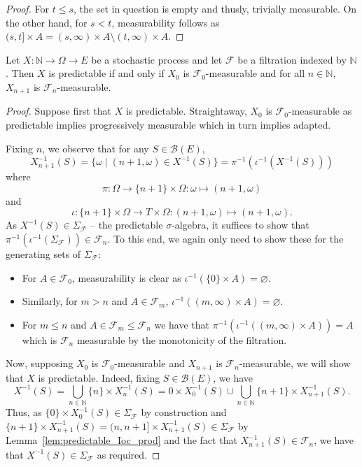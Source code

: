 \begin{proof}\leanok
For $t \le s$, the set in question is empty and thusly, trivially measurable. On the other hand, for $s < t$, measurability follows as
$(s, t] \times A = (s, \infty) \times A \setminus (t, \infty) \times A$.
\end{proof}


\begin{lemma}\label{lem:predictable_nat_iff}
  \mathlibok
Let $X : \mathbb{N} \to \Omega \to E$ be a stochastic process and let $\mathcal{F}$ be a filtration indexed by $\mathbb{N}$.
Then $X$ is predictable if and only if $X_0$ is $\mathcal{F}_0$-measurable and for all $n \in \mathbb{N}$, $X_{n+1}$ is $\mathcal{F}_n$-measurable.
\end{lemma}


\begin{proof}\leanok
Suppose first that $X$ is predictable. Straightaway, $X_0$ is $\mathcal{F}_0$-measurable as predictable implies progressively measurable which in turn implies adapted.

Fixing $n$, we observe that for any $S \in \mathcal{B}(E)$,
$$X_{n + 1}^{-1}(S) = \{\omega \mid (n + 1, \omega) \in X^{-1}(S)\} = \pi^{-1}(\iota^{-1}(X^{-1}(S)))$$
where
$$\pi : \Omega \to \{n + 1\} \times \Omega : \omega \mapsto (n + 1, \omega)$$
and
$$\iota : \{n + 1\} \times \Omega \to T \times \Omega : (n + 1, \omega) \mapsto (n + 1, \omega).$$
As $X^{-1}(S) \in \Sigma_{\mathcal{F}}$ -- the predictable $\sigma$-algebra, it suffices to show that $\pi^{-1}(\iota^{-1}(\Sigma_{\mathcal{F}})) \in \mathcal{F}_n$. To this end, we again only need to show these for the generating sets of $\Sigma_{\mathcal{F}}$:
\begin{itemize}
    \item For $A \in \mathcal{F}_0$, measurability is clear as $\iota^{-1}(\{0\} \times A) = \varnothing$.
    \item Similarly, for $m > n$ and $A \in \mathcal{F}_m$, $\iota^{-1}((m, \infty) \times A) = \varnothing$.
    \item For $m \le n$ and $A \in \mathcal{F}_m \le \mathcal{F}_n$ we have that $\pi^{-1}(\iota^{-1}((m, \infty) \times A)) = A$ which is $\mathcal{F}_n$ measurable by the monotonicity of the filtration.
\end{itemize}

Now, supposing $X_0$ is $\mathcal{F}_0$-measurable and $X_{n + 1}$ is $\mathcal{F}_n$-measurable, we will show that $X$ is predictable. Indeed, fixing $S \in \mathcal{B}(E)$, we have
$$X^{-1}(S) = \bigcup_{n \in \mathbb{N}} \{n\} \times X_n^{-1}(S) = {0} \times X_0^{-1}(S) \cup \bigcup_{n \in \mathbb{N}} \{n + 1\} \times X_{n + 1}^{-1}(S).$$
Thus, as $\{0\} \times X_0^{-1}(S) \in \Sigma_{\mathcal{F}}$ by construction and $\{n + 1\} \times X_{n + 1}^{-1}(S) = (n, n + 1] \times X_{n + 1}^{-1}(S) \in \Sigma_{\mathcal{F}}$ by Lemma~\ref{lem:predictable_Ioc_prod} and the fact that $X_{n + 1}^{-1}(S) \in \mathcal{F}_n$, we have that $X^{-1}(S) \in \Sigma_{\mathcal{F}}$ as required.
\end{proof}



